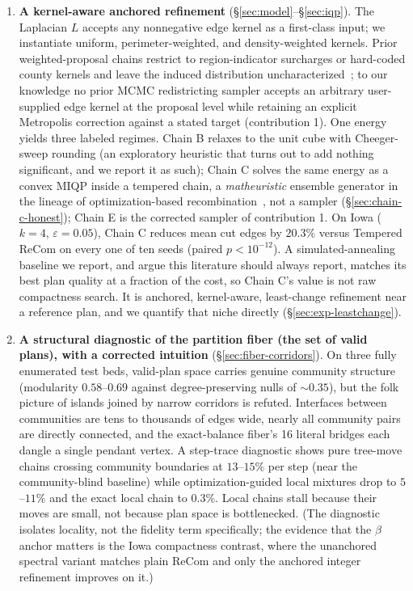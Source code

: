 \documentclass[11pt]{article}
\begin{document}
\begin{enumerate}
  \item \textbf{A kernel-aware anchored refinement}
    (\S\ref{sec:model}--\S\ref{sec:iqp}). The Laplacian $L$ accepts
    any nonnegative edge kernel as a first-class input; we
    instantiate uniform, perimeter-weighted, and density-weighted
    kernels. Prior weighted-proposal chains restrict to
    region-indicator surcharges or hard-coded county kernels and
    leave the induced distribution
    uncharacterized~\cite{clelland2022colorado,gerrychain2024,
    tapp2025compactness}; to our knowledge no prior MCMC
    redistricting sampler accepts an arbitrary user-supplied edge
    kernel at the proposal level while retaining an explicit
    Metropolis correction against a stated target (contribution 1).
    One energy yields three labeled regimes. Chain B relaxes to the
    unit cube with Cheeger-sweep rounding (an exploratory heuristic
    that turns out to add nothing significant, and we report it as
    such); Chain C solves the same energy as a convex MIQP inside a
    tempered chain, a \emph{matheuristic} ensemble generator in the
    lineage of optimization-based
    recombination~\cite{brous2025recom,cannon2023voting}, not a
    sampler (\S\ref{sec:chain-c-honest}); Chain E is the corrected
    sampler of contribution 1. On Iowa ($k = 4$,
    $\varepsilon = 0.05$), Chain C reduces mean cut edges by
    $20.3\%$ versus Tempered ReCom on every one of ten seeds
    (paired $p < 10^{-12}$). A simulated-annealing baseline we
    report, and argue this literature should always report, matches
    its best plan quality at a fraction of the cost, so Chain C's
    value is not raw compactness search. It is anchored, kernel-aware,
    least-change refinement near a reference plan, and we quantify
    that niche directly (\S\ref{sec:exp-leastchange}).

  \item \textbf{A structural diagnostic of the partition fiber (the
    set of valid plans), with a corrected intuition}
    (\S\ref{sec:fiber-corridors}). On three fully enumerated test
    beds, valid-plan space carries genuine community structure
    (modularity $0.58$--$0.69$ against degree-preserving nulls of
    $\sim 0.35$), but the folk picture of islands joined by narrow
    corridors is refuted. Interfaces between communities are tens to
    thousands of edges wide, nearly all community pairs are directly
    connected, and the exact-balance fiber's 16 literal bridges each
    dangle a single pendant vertex. A step-trace diagnostic shows
    pure tree-move chains crossing community boundaries at
    $13$--$15\%$ per step (near the community-blind baseline) while
    optimization-guided local mixtures drop to $5$--$11\%$ and the
    exact local chain to $0.3\%$. Local chains stall because their
    moves are small, not because plan space is bottlenecked. (The
    diagnostic isolates locality, not the fidelity term
    specifically; the evidence that the $\beta$ anchor matters is
    the Iowa compactness contrast, where the unanchored spectral
    variant matches plain ReCom and only the anchored integer
    refinement improves on it.)
\end{enumerate}
\end{document}
